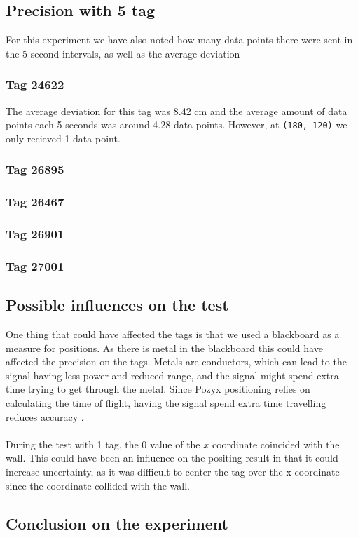 \subsection{Precision with 5 tag}
For this experiment we have also noted how many data points there were sent in the 5 second intervals, as well as the average deviation

\subsubsection{Tag 24622}
The average deviation for this tag was 8.42 cm and the average amount of data points each 5 seconds was around 4.28 data points.
However, at \texttt{(180, 120)} we only recieved 1 data point.

\subsubsection{Tag 26895}


\subsubsection{Tag 26467}


\subsubsection{Tag 26901}


\subsubsection{Tag 27001}

\subsection{Possible influences on the test}
One thing that could have affected the tags is that we used a blackboard as a measure for positions. 
As there is metal in the blackboard this could have affected the precision on the tags.
Metals are conductors, which can lead to the signal having less power and reduced range, and the signal might spend extra time trying to get through the metal.
Since Pozyx positioning relies on calculating the time of flight, having the signal spend extra time travelling reduces accuracy \cite{pozyx-UWBObstacles}. 
\\\\
During the test with 1 tag, the 0 value of the $x$ coordinate coincided with the wall. 
This could have been an influence on the positing result in that it could increase uncertainty, as it was difficult to center the tag over the x coordinate since the coordinate collided with the wall.

\subsection{Conclusion on the experiment}
